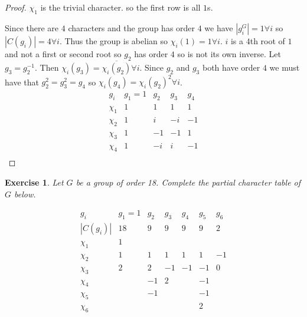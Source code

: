 \documentclass{article}
\newtheorem{exercise}[theorem]{Exercise}
\begin{document}
\begin{proof}
$\chi_1$ is the trivial character. so the first row is all $1$s.

Since there are $4$ characters and the group has order $4$ we have $|g_i^G|=1\forall i$ so $|C(g_i)|=4\forall i$. Thus the group is abelian so $\chi_i(1)=1\forall i$. $i$ is a $4$th root of $1$ and not a first or second root so $g_2$ has order $4$ so is not its own inverse. Let $g_3=g_2^{-1}$. Then $\chi_i(g_3)=\overline{\chi_i(g_2)}\forall i$. Since $g_2$ and $g_3$ both have order $4$ we must have that $g_2^2=g_3^2=g_4$ so $\chi_i(g_4)=\chi_i(g_2)^2\forall i$.
\[
    \begin{array}{c|cccc}
    g_i & g_1 = 1 & g_2 & g_3 & g_4 \\
    \hline
    \chi_1 &  1& 1 &  1& 1 \\
    \chi_2 &  1& i &  -i&-1  \\
    \chi_3 & 1 & -1 &  -1&1  \\
    \chi_4 &  1& -i &  i& -1 \\
    \end{array}
    \]
\end{proof}
\begin{exercise}
    Let \( G \) be a group of order 18. Complete the partial character table of \( G \) below.

    \[
    \begin{array}{c|cccccc}
    g_i & g_1 = 1 & g_2 & g_3 & g_4 & g_5 & g_6 \\
    |C(g_i)| & 18 & 9 & 9 & 9 & 9 & 2 \\
    \hline
    \chi_1 & 1 &   &   &   &   &   \\
    \chi_2 & 1 & 1 & 1 & 1 & 1 & -1 \\
    \chi_3 & 2 & 2 & -1 & -1 & -1 & 0 \\
    \chi_4 &  & -1 & 2 &  & -1 &  \\
    \chi_5 &  & -1 &  &  & -1 &  \\
    \chi_6 &   &   &  &  & 2 &  \\
    \end{array}
    \]
\end{exercise}
\end{document}
